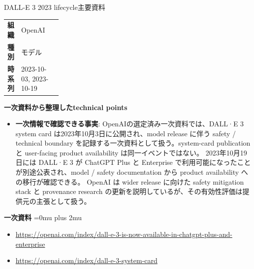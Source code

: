 \begin{technicalnote}{DALL-E 3 2023 lifecycle}{主要資料}
\begingroup
\begin{tabularx}{\linewidth}{@{}>{\bfseries}p{0.22\linewidth}X@{}}
組織 & OpenAI \\
種別 & モデル \\
時系列 & 2023-10-03, 2023-10-19 \\
\end{tabularx}
\smallskip
{\bfseries 一次資料から整理したtechnical points}
\begin{itemize}[leftmargin=1.5em,itemsep=0.35em]
\item \textbf{一次情報で確認できる事実}: OpenAIの選定済み一次資料では、DALL·E 3 system card は2023年10月3日に公開され、model release に伴う safety / technical boundary を記録する一次資料として扱う。system-card publication と user-facing product availability は同一イベントではない。 2023年10月19日には DALL·E 3 が ChatGPT Plus と Enterprise で利用可能になったことが別途公表され、model / safety documentation から product availability への移行が確認できる。 OpenAI は wider release に向けた safety mitigation stack と provenance research の更新を説明しているが、その有効性評価は提供元の主張として扱う。
\end{itemize}
\begin{minipage}{\linewidth}
\begin{samepage}
{\bfseries 一次資料}
\begingroup\sloppy
\Urlmuskip=0mu plus 2mu\relax
\begin{itemize}[leftmargin=1.5em,itemsep=0.25em]
\item {\scriptsize\url{https://openai.com/index/dall-e-3-is-now-available-in-chatgpt-plus-and-enterprise}}
\item {\scriptsize\url{https://openai.com/index/dall-e-3-system-card}}
\end{itemize}
\endgroup
\end{samepage}
\end{minipage}
\endgroup
\end{technicalnote}
\medskip

